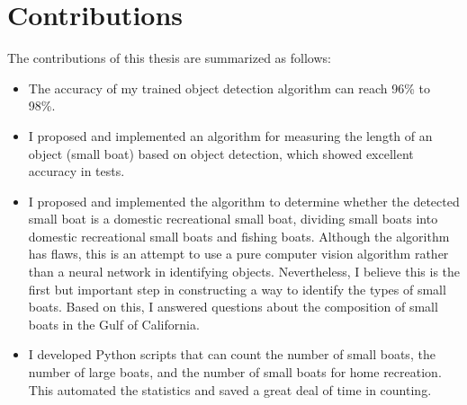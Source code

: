 \newpage
\section{Contributions}
The contributions of this thesis are summarized as follows:
\begin{itemize}
    \item The accuracy of my trained object detection algorithm can reach 96\% to 98\%.

    \item I proposed and implemented an algorithm for measuring the length of an object (small boat) based on object detection, which showed excellent accuracy in tests.

    \item I proposed and implemented the algorithm to determine whether the detected small boat is a domestic recreational small boat, dividing small boats into domestic recreational small boats and fishing boats. Although the algorithm has flaws, this is an attempt to use a pure computer vision algorithm rather than a neural network in identifying objects. Nevertheless, I believe this is the first but important step in constructing a way to identify the types of small boats. Based on this, I answered questions about the composition of small boats in the Gulf of California.

    \item I developed Python scripts that can count the number of small boats, the number of large boats, and the number of small boats for home recreation. This automated the statistics and saved a great deal of time in counting.

\end{itemize}